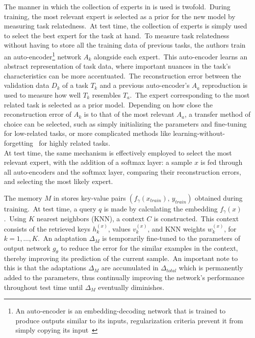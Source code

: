 The manner in which the collection of experts in \textcite{Aljundi2016} is used is twofold.\ During training, the most relevant expert is selected as a prior for the new model by measuring task relatedness.\ At test time, the collection of experts is simply used to select the best expert for the task at hand.\ To measure task relatedness without having to store all the training data of previous tasks, the authors train an auto-encoder\footnote{An auto-encoder is an embedding-decoding network that is trained to produce outputs similar to its inputs, regularization criteria prevent it from simply copying its input~\cite{Aljundi2016}} network $A_k$ alongside each expert.\ This auto-encoder learns an abstract representation of task data, where important nuances in the task's characteristics can be more accentuated.\ The reconstruction error between the validation data $D_k$ of a task $T_k$ and a previous auto-encoder's $A_a$ reproduction is used to measure how well $T_k$ resembles $T_a$.\ The expert corresponding to the most related task is selected as a prior model.\ Depending on how close the reconstruction error of $A_k$ is to that of the most relevant $A_a$, a transfer method of choice can be selected, such as simply initializing the parameters and fine-tuning for low-related tasks, or more complicated methods like learning-without-forgetting~\cite{Li2016} for highly related tasks.\\
At test time, the same mechanism is effectively employed to select the most relevant expert, with the addition of a softmax layer: a sample $x$ is fed through all auto-encoders and the softmax layer, comparing their reconstruction errors, and selecting the most likely expert.

The memory $M$ in \textcite{Sprechmann2018} stores key-value pairs $(f_\gamma(x_{train}),\, y_{train})$ obtained during training.\ At test time, a query $q$ is made by calculating the embedding $f_\gamma(x)$.\ Using $K$ nearest neighbors (KNN), a context $C$ is constructed.\ This context consists of the retrieved keys $h^{(x)}_k$, values $v^{(x)}_k$, and KNN weights $w^{(x)}_k$, for $k=1,\ldots,K$.\ An adaptation $\Delta_M$ is temporarily fine-tuned to  the parameters of output network $g_\theta$  to reduce the error for the similar examples in the context, thereby improving its prediction of the current sample.\ An important note to this is that the adaptations $\Delta_M$ are accumulated in $\Delta_{total}$ which is permanently added to the parameters, thus continually improving the network's performance throughout test time until $\Delta_M$ eventually diminishes.

